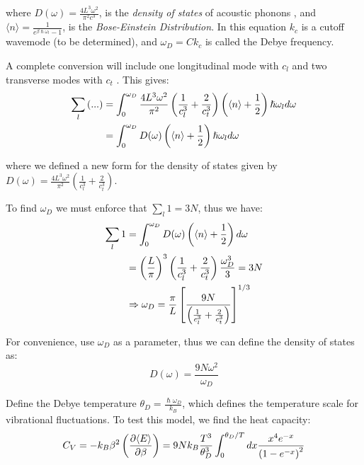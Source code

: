 \documentclass[book.tex]{subfiles}
\begin{document}
\noindent where $\displaystyle D(\omega) = \frac{4L^3\omega^2}{\pi^2c^3}$, is the \textit{density of states} of acoustic phonons , and $\displaystyle \langle n \rangle = \frac{1}{e^{\beta\hslash\omega_l} - 1}$, is the \textit{Bose-Einstein Distribution}. In this equation $k_c$ is a cutoff wavemode (to be determined), and $\omega_D = Ck_c$ is called the Debye frequency.

A complete conversion will include one longitudinal mode with $c_l$ and two transverse modes with $c_t$ . This gives:
\begin{align}\label{Eq22}
\sum_l\left( ... \right) &= \int_0^{\omega_D} \frac{4L^3\omega^2}{\pi^2}\left(\frac{1}{c_l^3} + \frac{2}{c_t^3} \right) \left( \langle n \rangle + \frac{1}{2} \right) \hslash\omega_l d\omega \notag\\
&=\int_0^{\omega_D} D(\omega) \left( \langle n \rangle + \frac{1}{2} \right) \hslash\omega_l d\omega
\end{align}

\noindent where we defined a new form for the density of states given by $\displaystyle D(\omega) = \frac{4L^3\omega^2}{\pi^2}\left(\frac{1}{c_l^3} + \frac{2}{c_t^3} \right)$.

To find $\omega_D$ we must enforce that $\sum_l 1 = 3N$, thus we have:
\begin{align}
\sum_l 1 &= \int_0^{\omega_D}D(\omega) \left( \langle n \rangle + \frac{1}{2} \right) d\omega \notag\\
&= \left(\frac{L}{\pi}\right)^3 \left(\frac{1}{c_l^3} + \frac{2}{c_t^3} \right) \frac{\omega_D^3}{3} = 3N \notag\\&\Rightarrow \omega_D = \frac{\pi}{L}\left[\frac{9N}{\left(\frac{1}{c_l^3} + \frac{2}{c_t^3} \right)}\right]^{1/3} \notag
\end{align}

For convenience, use $\omega_D$ as a parameter, thus we can define the density of states as:
\begin{equation}\label{Eq23}
D(\omega) = \frac{9N\omega^2}{\omega_D}
\end{equation}


Define the Debye temperature $\theta_D = \frac{\hslash\omega_D}{k_B}$, which defines the temperature scale for vibrational fluctuations. To test this model, we find the heat capacity:
\begin{equation}
C_V = -k_B\beta^2\left(\frac{\partial\langle E\rangle}{\partial\beta}\right) = 9Nk_B\frac{T^3}{\theta_D^3}\int_0^{\theta_D/T}dx\frac{x^4e^{-x}}{\left(1-e^{-x}\right)^2} \notag
\end{equation}
\end{document}
